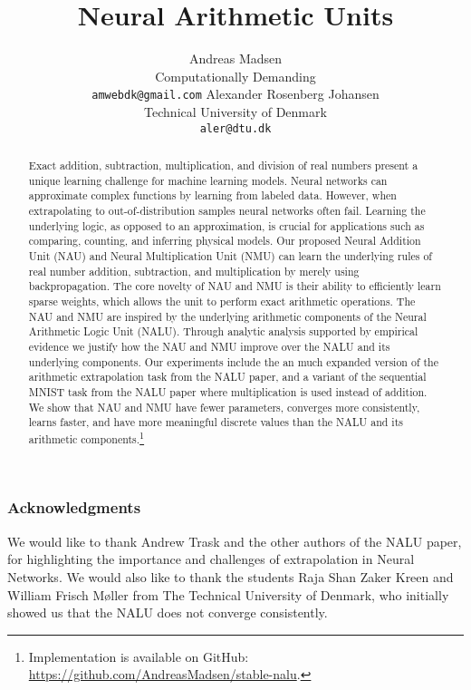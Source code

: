 \documentclass{article}
\title{Neural Arithmetic Units}
\author{%
  Andreas Madsen \\
  Computationally Demanding \\
  \texttt{amwebdk@gmail.com}
  \And
  Alexander Rosenberg Johansen \\
  Technical University of Denmark \\
  \texttt{aler@dtu.dk} \\
}
\def\nonanonymous{}
\begin{document}
\maketitle

\begin{abstract}
Exact addition, subtraction, multiplication, and division of real numbers present a unique learning challenge for machine learning models. Neural networks can approximate complex functions by learning from labeled data. However, when extrapolating to out-of-distribution samples neural networks often fail. Learning the underlying logic, as opposed to an approximation, is crucial for applications such as comparing, counting, and inferring physical models. Our proposed Neural Addition Unit (NAU) and Neural Multiplication Unit (NMU) can learn the underlying rules of real number addition, subtraction, and multiplication by merely using backpropagation. The core novelty of NAU and NMU is their ability to efficiently learn sparse weights, which allows the unit to perform exact arithmetic operations. The NAU and NMU are inspired by the underlying arithmetic components of the Neural Arithmetic Logic Unit (NALU). Through analytic analysis supported by empirical evidence we justify how the NAU and NMU improve over the NALU and its underlying components. Our experiments include the an much expanded version of the arithmetic extrapolation task from the NALU paper, and a variant of the sequential MNIST task from the NALU paper where multiplication is used instead of addition. We show that NAU and NMU have fewer parameters, converges more consistently, learns faster, and have more meaningful discrete values than the NALU and its arithmetic components.\ifdefined\nonanonymous\footnote{Implementation is available on GitHub: \url{https://github.com/AndreasMadsen/stable-nalu}.}\fi
\end{abstract}







\clearpage
\ifdefined\nonanonymous
\subsubsection*{Acknowledgments}
We would like to thank Andrew Trask and the other authors of the NALU paper, for highlighting the importance and challenges of extrapolation in Neural Networks. We would also like to thank the students Raja Shan Zaker Kreen and William Frisch Møller from The Technical University of Denmark, who initially showed us that the NALU does not converge consistently.
\fi




\newpage
\appendix

\clearpage

\clearpage

\clearpage

\clearpage
\end{document}
